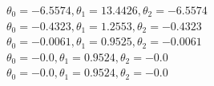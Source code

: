 \documentclass[11pt]{article} %
\begin{document}
\begin{figure}[h]
\qquad
{}
\end{figure}
\(\theta_0= -6.5574, \theta_1= 13.4426 , \theta_2= -6.5574\)\\
\(\theta_0= -0.4323, \theta_1= 1.2553 , \theta_2= -0.4323\)\\
\(\theta_0= -0.0061, \theta_1= 0.9525 , \theta_2= -0.0061\)\\
\(\theta_0= -0.0, \theta_1= 0.9524 , \theta_2= -0.0\)\\
\(\theta_0= -0.0, \theta_1= 0.9524 , \theta_2= -0.0\)\\
\end{document}
